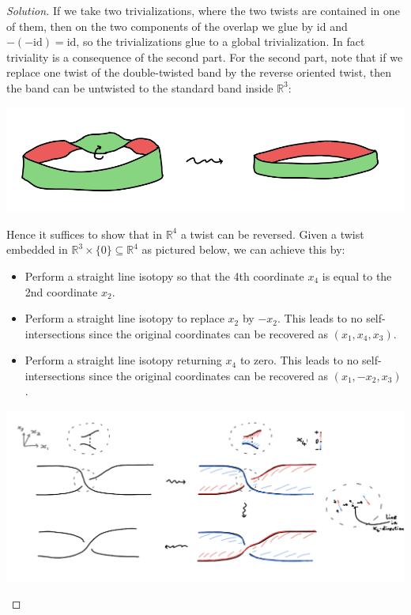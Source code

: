 \documentclass{article}
\theoremstyle{definition}
\newcommand{\id}{\mathrm{id}}
\newcommand{\R}{\mathbb{R}}
\begin{document}
\begin{proof}[Solution]
    If we take two trivializations, where the two twists are contained in one of
    them, then on the two components of the overlap we glue by $\id$ and
    $-(-\id)=\id$, so the trivializations glue to a global trivialization. In
    fact triviality is a consequence of the second part. For the second part,
    note that if we replace one twist of the double-twisted band by the reverse
    oriented twist, then the band can be untwisted to the standard band inside
    $\R^3$:
    \begin{center}
        \includegraphics[scale=0.3]{chern_isotopy1}
    \end{center}
    Hence it suffices to show that in $\R^4$ a twist can be reversed. Given a
    twist embedded in $\R^3\times\{0\}\subseteq\R^4$ as pictured below, we can
    achieve this by:
    \begin{itemize}
        \item Perform a straight line isotopy so that the 4th coordinate $x_4$
            is equal to the 2nd coordinate $x_2$.
        \item Perform a straight line isotopy to replace $x_2$ by $-x_2$. This
            leads to no self-intersections since the original coordinates
            can be recovered as $(x_1,x_4,x_3)$.
        \item Perform a straight line isotopy returning $x_4$ to zero. This
            leads to no self-intersections since the original coordinates can
            be recovered as $(x_1,-x_2,x_3)$.
    \end{itemize}
    \begin{center}
        \includegraphics[scale=0.5]{chern_isotopy2}
    \end{center}
\end{proof}
\end{document}
